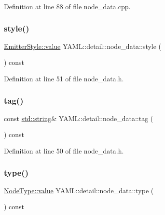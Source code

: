 Definition at line 88 of file node\+\_\+data.\+cpp.

\mbox{\label{class_y_a_m_l_1_1detail_1_1node__data_af1a062a51a54401fbba6ba85f643b059}} 
\subsubsection{\texorpdfstring{style()}{style()}}
{\footnotesize\ttfamily \mbox{\hyperlink{struct_y_a_m_l_1_1_emitter_style_ae86640662c85ce6062a37f9636b6959f}{Emitter\+Style\+::value}} Y\+A\+M\+L\+::detail\+::node\+\_\+data\+::style (\begin{DoxyParamCaption}{ }\end{DoxyParamCaption}) const\hspace{0.3cm}{\ttfamily [inline]}}



Definition at line 51 of file node\+\_\+data.\+h.

\mbox{\label{class_y_a_m_l_1_1detail_1_1node__data_ab8b57b9cb59edf5b8669f93a2315fccc}} 
\subsubsection{\texorpdfstring{tag()}{tag()}}
{\footnotesize\ttfamily const \mbox{\hyperlink{glad_8h_ac83513893df92266f79a515488701770}{std\+::string}}\& Y\+A\+M\+L\+::detail\+::node\+\_\+data\+::tag (\begin{DoxyParamCaption}{ }\end{DoxyParamCaption}) const\hspace{0.3cm}{\ttfamily [inline]}}



Definition at line 50 of file node\+\_\+data.\+h.

\mbox{\label{class_y_a_m_l_1_1detail_1_1node__data_aff9369bc7ec59c7a7cf4c8799e11791d}} 
\subsubsection{\texorpdfstring{type()}{type()}}
{\footnotesize\ttfamily \mbox{\hyperlink{struct_y_a_m_l_1_1_node_type_af83cf3f3c2eca0bf0eae1bbf981e86c4}{Node\+Type\+::value}} Y\+A\+M\+L\+::detail\+::node\+\_\+data\+::type (\begin{DoxyParamCaption}{ }\end{DoxyParamCaption}) const\hspace{0.3cm}{\ttfamily [inline]}}



